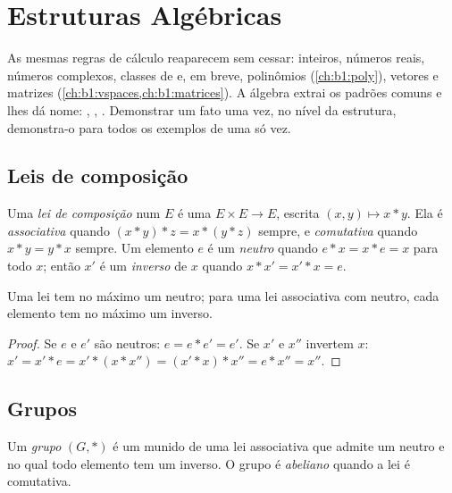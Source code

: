\chapter{Estruturas Algébricas}\label{ch:b1:structures}

As mesmas regras de cálculo reaparecem sem cessar: inteiros, números
reais, números complexos, classes de  e, em breve, polinômios
(\cref{ch:b1:poly}), vetores e matrizes
(\cref{ch:b1:vspaces,ch:b1:matrices}). A álgebra extrai os padrões comuns
e lhes dá nome: \emph{}, \emph{}, \emph{}.
Demonstrar um fato uma vez, no nível da estrutura, demonstra-o para
todos os exemplos de uma só vez.

\section{Leis de composição}

\begin{definition}\label{def:b1:structures:law}
Uma \emph{lei de composição} num  $E$ é
uma  $E \times E \to E$, escrita $(x, y) \mapsto x * y$. Ela é
\emph{associativa} quando $(x*y)*z = x*(y*z)$ sempre, e \emph{comutativa}
quando $x * y = y * x$ sempre. Um elemento $e$ é um \emph{neutro} quando
$e * x = x * e = x$ para todo $x$; então $x'$ é um \emph{inverso} de $x$
quando $x * x' = x' * x = e$.
\end{definition}

\begin{proposition}[Unicidade]\label{prop:b1:structures:unique}
Uma lei tem no máximo um neutro; para uma lei associativa com neutro,
cada elemento tem no máximo um inverso.
\end{proposition}

\begin{proof}
Se $e$ e $e'$ são neutros: $e = e * e' = e'$. Se $x'$ e $x''$
invertem $x$: $x' = x' * e = x' * (x * x'') = (x' * x) * x'' = e * x''
= x''$.
\end{proof}

\section{Grupos}

\begin{definition}[Grupo]\label{def:b1:structures:group}
Um \emph{grupo} $(G, *)$ é um  munido de uma lei
associativa que admite um neutro e no qual todo elemento tem um inverso.
O grupo é \emph{abeliano} quando a lei é
comutativa.
\end{definition}

